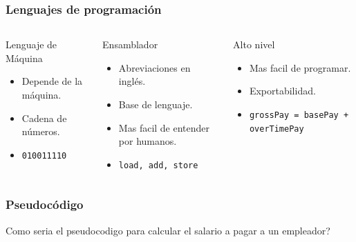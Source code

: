 \documentclass[10.5pt,scale=1.0,t,aspectratio=169,hyperref={pdfpagelabels=false}]{beamer}
\begin{document}
\begin{frame}
	\frametitle{Lenguajes de programación}
	\begin{columns}
		\begin{block}{\small Lenguaje de Máquina}
			\justifying
			\small
			\begin{itemize}
				\item Depende de la máquina.
				\item Cadena de números.
				\item \texttt{010011110}
			\end{itemize}
		\end{block}
		
		\begin{block}{\small Ensamblador}
			\justifying
			\small
			\begin{itemize}
				\item Abreviaciones en inglés.
				\item Base de lenguaje.
				\item Mas facil de entender por humanos.
				\item \texttt{load, add, store}
			\end{itemize}
		\end{block}
	
		\begin{block}{\small Alto nivel}
			\justifying
			\small
			\begin{itemize}
				\item Mas facil de programar.
				\item Exportabilidad. 
				\item \texttt{grossPay = basePay + overTimePay}
			\end{itemize}
		\end{block}
	\end{columns}
\end{frame}
\begin{frame}
	\frametitle{Pseudocódigo}
	Como seria el pseudocodigo para calcular el salario a pagar a un empleador?
\end{frame}
\end{document}

